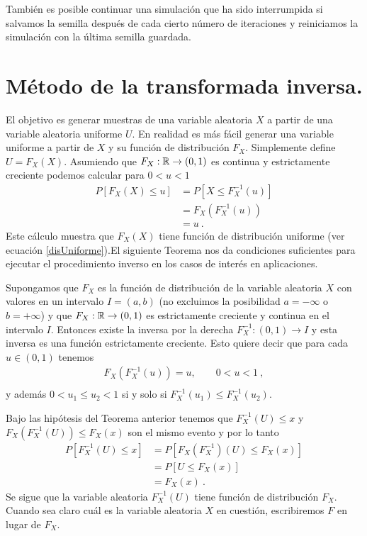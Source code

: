 \documentclass[12pt,reqno]{amsart}\usepackage[]{graphicx}\usepackage[]{color}
\begin{document}
También es posible continuar una simulación que ha sido interrumpida si salvamos la semilla después de cada cierto número de iteraciones y reiniciamos la simulación con la última semilla guardada.

\section{Método de la transformada inversa.}
El objetivo es generar muestras de una variable aleatoria $X$ a partir de una variable aleatoria uniforme $U$. En realidad es más fácil generar una variable uniforme a partir de $X$ y su función de distribución $F_{X}$. Simplemente define $U = F_X(X)$. Asumiendo que $F_{X}:\mathbb{R}\to (0,1)$ es continua y estrictamente creciente podemos calcular para $0<u<1$
\begin{equation}\label{ideaPrincipal}
  \begin{split}
   P[F_X(X)\leq u ] &= P[X\leq F_X^{-1}(u)]\\
   &= F_X(F_X^{-1}(u))\\
   &= u\:.
  \end{split}
\end{equation}
Este cálculo muestra que $F_X(X)$ tiene función de distribución uniforme (ver ecuación \eqref{disUniforme}).El siguiente Teorema nos da condiciones suficientes para ejecutar el procedimiento inverso en los casos de interés en aplicaciones.
\begin{thm}
Supongamos que $F_{X}$ es la función de distribución de la variable aleatoria $X$ con valores en un intervalo $I=(a,b)$ (no excluimos la posibilidad $a = -\infty$ o $b = +\infty$) y que $F_{X}:\mathbb{R} \to (0,1)$ es estrictamente creciente y continua en el intervalo $I$. Entonces existe la inversa por la derecha $F_{X}^{-1}:(0,1)\to I$ y esta inversa es una función estrictamente creciente. Esto quiere decir que para cada $u\in (0,1)$ tenemos
\begin{equation}\label{distribucionInversa}
  \begin{split}
  F_{X}(F_{X}^{-1}(u)) = u  , \qquad 0 < u < 1\:,\\
  \end{split}
\end{equation}
y además $0 < u_1 \leq u_2 < 1$ si y solo si $F_{X}^{-1}(u_1) \leq F_{X}^{-1}(u_2)$.
\end{thm}
Bajo las hipótesis del Teorema anterior tenemos que $F_{X}^{-1}(U)\leq x$ y $F_{X}(F_{X}^{-1}(U))\leq F_{X}(x)$ son el mismo evento y por lo tanto
\begin{equation}\label{DistribucionInversa}
  \begin{split}
  P[F_{X}^{-1}(U)\leq x] &= P[F_{X}(F_{X}^{-1})(U)\leq F_{X}(x)]\\ 
  &= P[U \leq F_X(x) ]\\
  &= F_X (x)\:.
  \end{split}
\end{equation}
Se sigue que la variable aleatoria $F_{X}^{-1}(U)$ tiene función de distribución $F_X$. Cuando sea claro cuál es la variable aleatoria $X$ en cuestión, escribiremos $F$ en lugar de $F_X$.
\end{document}
